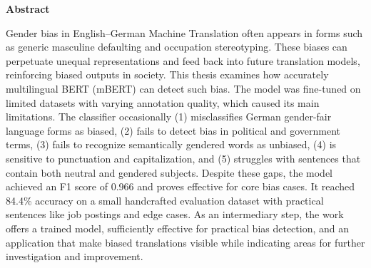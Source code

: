 \thispagestyle{empty}


\vspace*{1cm}

\begin{center}
    \textbf{Abstract}
\end{center}

\vspace*{1cm}

\noindent 
Gender bias in English–German Machine Translation often appears in forms such as generic masculine defaulting and occupation stereotyping. These biases can perpetuate unequal representations and feed back into future translation models, reinforcing biased outputs in society. This thesis examines how accurately multilingual BERT (mBERT) can detect such bias. The model was fine-tuned on limited datasets with varying annotation quality, which caused its main limitations. The classifier occasionally (1) misclassifies German gender-fair language forms as biased, (2) fails to detect bias in political and government terms, (3) fails to recognize semantically gendered words as unbiased, (4) is sensitive to punctuation and capitalization, and (5) struggles with sentences that contain both neutral and gendered subjects. Despite these gaps, the model achieved an F1 score of 0.966 and proves effective for core bias cases. It reached 84.4\% accuracy on a small handcrafted evaluation dataset with practical sentences like job postings and edge cases. As an intermediary step, the work offers a trained model, sufficiently effective for practical bias detection, and an application that make biased translations visible while indicating areas for further investigation and improvement.